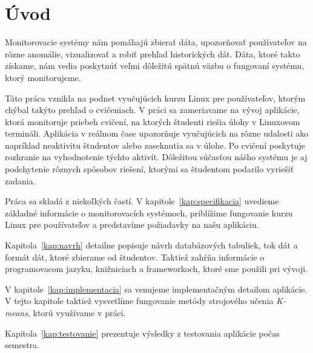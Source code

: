 \chapter*{Úvod} %

Monitorovacie systémy nám pomáhajú zbierať dáta, upozorňovať používateľov na rôzne
anomálie, vizualizovať a robiť prehľad historických dát. Dáta, ktoré takto získame, nám
vedia poskytnúť veľmi dôležitú spätnú väzbu o fungovaní systému, ktorý monitorujeme.

Táto práca vznikla na podnet vyučujúcich kurzu Linux pre používateľov, ktorým chýbal
takýto prehľad o cvičeniach. V práci sa zameriavame na vývoj aplikácie, ktorá
monitoruje priebeh cvičení, na ktorých študenti riešia úlohy v Linuxovom termináli.
Aplikácia v reálnom čase upozorňuje vyučujúcich na rôzne udalosti
ako napríklad neaktivitu študentov alebo zaseknutia sa v úlohe.
Po cvičení poskytuje rozhranie na vyhodnotenie týchto aktivít. Dôležitou súčasťou
nášho systému je aj podchytenie rôznych spôsobov riešení, ktorými  sa študentom
podarilo vyriešiť zadania.

Práca sa skladá z niekoľkých častí. V kapitole~\ref{kap:specifikacia} uvedieme základné
informácie o monitorovacích systémoch, priblížime fungovanie kurzu Linux pre používateľov
a predstavíme požiadavky na našu aplikáciu.

Kapitola~\ref{kap:navrh} detailne popisuje návrh databázových tabuliek, tok dát a
formát dát, ktoré zbierame od študentov. Taktiež zahŕňa informácie o programovacom jazyku,
knižniciach a frameworkoch, ktoré sme použili pri vývoji.

V kapitole~\ref{kap:implementacia} sa venujeme implementačným detailom aplikácie. V tejto
kapitole taktiež vysvetlíme fungovanie metódy strojového učenia \textit{K-means}, ktorú
využívame v práci.

Kapitola~\ref{kap:testovanie} prezentuje výsledky z testovania aplikácie počas semestra.